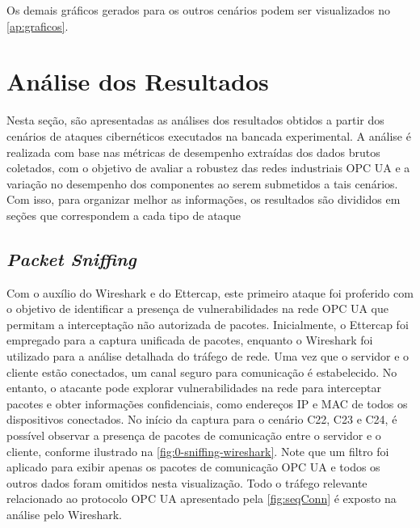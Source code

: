 Os demais gráficos gerados para os outros cenários podem ser visualizados no \autoref{ap:graficos}.

\section{Análise dos Resultados} \label{sec:analise-resultados}

Nesta seção, são apresentadas as análises dos resultados obtidos a partir dos cenários de ataques cibernéticos executados na bancada experimental. A análise é realizada com base nas métricas de desempenho extraídas dos dados brutos coletados, com o objetivo de avaliar a robustez das redes industriais OPC UA e a variação no desempenho dos componentes ao serem submetidos a tais cenários. Com isso, para organizar melhor as informações, os resultados são divididos em seções que correspondem a cada tipo de ataque

\subsection{\textit{Packet Sniffing}}

Com o auxílio do Wireshark e do Ettercap, este primeiro ataque foi proferido com o objetivo de identificar a presença de vulnerabilidades na rede OPC UA que permitam a interceptação não autorizada de pacotes. Inicialmente, o Ettercap foi empregado para a captura unificada de pacotes, enquanto o Wireshark foi utilizado para a análise detalhada do tráfego de rede. Uma vez que o servidor e o cliente estão conectados, um canal seguro para comunicação é estabelecido. No entanto, o atacante pode explorar vulnerabilidades na rede para interceptar pacotes e obter informações confidenciais, como endereços IP e MAC de todos os dispositivos conectados. No início da captura para o cenário C22, C23 e C24, é possível observar a presença de pacotes de comunicação entre o servidor e o cliente, conforme ilustrado na \autoref{fig:0-sniffing-wireshark}. Note que um filtro foi aplicado para exibir apenas os pacotes de comunicação OPC UA e todos os outros dados foram omitidos nesta visualização. Todo o tráfego relevante relacionado ao protocolo OPC UA apresentado pela \autoref{fig:seqConn} é exposto na análise pelo Wireshark.

